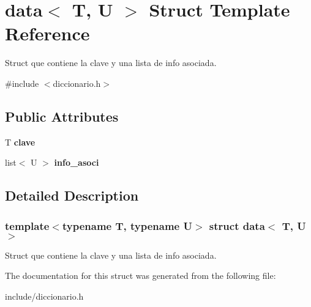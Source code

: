 \hypertarget{structdata}{}\section{data$<$ T, U $>$ Struct Template Reference}
\label{structdata}


Struct que contiene la clave y una lista de info asociada.  




{\ttfamily \#include $<$diccionario.\+h$>$}

\subsection*{Public Attributes}
\begin{DoxyCompactItemize}
\item 
\mbox{\label{structdata_aa3298b9b021e026f8663005d2fc19e1a}} 
T {\bfseries clave}
\item 
\mbox{\label{structdata_a8299bf6975cfaffbb2354a65881e16a2}} 
list$<$ U $>$ {\bfseries info\+\_\+asoci}
\end{DoxyCompactItemize}


\subsection{Detailed Description}
\subsubsection*{template$<$typename T, typename U$>$\newline
struct data$<$ T, U $>$}

Struct que contiene la clave y una lista de info asociada. 

The documentation for this struct was generated from the following file\+:\begin{DoxyCompactItemize}
\item 
include/diccionario.\+h\end{DoxyCompactItemize}
